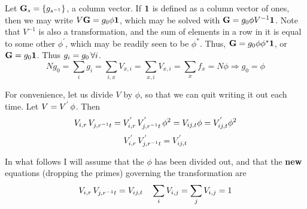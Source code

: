 \documentclass[12pt]{article}
\begin{document}
 Let ${\bf G}_s = \{ g_{s^{-1}} \}$, a
column vector.  If ${\bf 1}$ is defined as a column vector of ones, then
we may write $V {\bf G} = g_0 \phi {\bf 1}$, which may be solved with
${\bf G} = g_0 \phi V^{-1} {\bf 1}$.  Note that $V^{-1}$ is also a
transformation, and the sum of elements in a row in it is equal to
some other $\phi^{\prime}$, which may be readily seen to be $\phi^*$.
Thus, ${\bf G} = g_0 \phi \phi^* {\bf 1}$, or ${\bf G} = g_0 {\bf 1}$.
Thus $g_i = g_0 \thinspace \forall i$.
$$
N g_0 = \sum_i g_i = \sum_{i,x} V_{x,i} = \sum_{x,i} V_{x,i} = \sum_x
f_x = N \phi \Rightarrow g_0 = \phi
$$

 For convenience, let us divide $V$ by $\phi$, so that we can quit
writing it out each time.  Let $V = V^{'} \thinspace \phi$.  Then
$$
V_{i,r} \thinspace V_{j,r^{-1}t} = V^{'}_{i,r} \thinspace V^{'}_{j,r^{-1}t}
\thinspace \phi^2 = V_{ij,t} \phi = V^{'}_{ij,t} \phi^2
$$
$$
V^{'}_{i,r} \thinspace V^{'}_{j,r^{-1}t} = V^{'}_{ij,t}
$$

 In what follows I will assume that the $\phi$ has been divided out, and
that the {\bf new} equations (dropping the primes) governing the transformation
are
\begin{equation}
V_{i,r} \thinspace V_{j,r^{-1}t} = V_{ij,t}
\quad \sum_i V_{i,j} = \sum_j V_{i,j} = 1
\end{equation}
\end{document}
